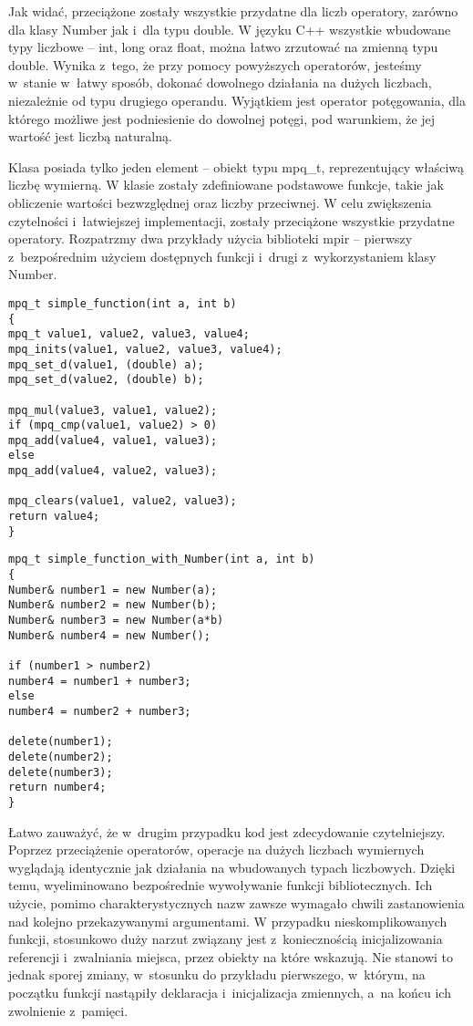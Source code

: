 Jak widać, przeciążone zostały wszystkie przydatne dla liczb operatory, zarówno dla klasy Number jak i~dla typu double. W języku C++ wszystkie wbudowane typy liczbowe -- int, long oraz float, można łatwo zrzutować na zmienną typu double. Wynika z~tego, że przy pomocy powyższych operatorów, jesteśmy w~stanie w~łatwy sposób, dokonać dowolnego działania na dużych liczbach, niezależnie od typu drugiego operandu. Wyjątkiem jest operator potęgowania, dla którego możliwe jest podniesienie do dowolnej potęgi, pod warunkiem, że jej wartość jest liczbą naturalną.

Klasa posiada tylko jeden element – obiekt typu mpq\_t, reprezentujący właściwą liczbę wymierną. W klasie zostały zdefiniowane podstawowe funkcje, takie jak obliczenie wartości bezwzględnej oraz liczby przeciwnej. W celu zwiększenia czytelności i~łatwiejszej implementacji, zostały przeciążone wszystkie przydatne operatory. Rozpatrzmy dwa przykłady użycia biblioteki mpir – pierwszy z~bezpośrednim użyciem dostępnych funkcji i~drugi z~wykorzystaniem klasy Number.

\begin{lstlisting}
mpq_t simple_function(int a, int b)
{
mpq_t value1, value2, value3, value4;
mpq_inits(value1, value2, value3, value4);
mpq_set_d(value1, (double) a);
mpq_set_d(value2, (double) b);

mpq_mul(value3, value1, value2);
if (mpq_cmp(value1, value2) > 0)
mpq_add(value4, value1, value3);
else
mpq_add(value4, value2, value3);

mpq_clears(value1, value2, value3);
return value4;
}
\end{lstlisting}

\begin{lstlisting}
mpq_t simple_function_with_Number(int a, int b)
{
Number& number1 = new Number(a);
Number& number2 = new Number(b);
Number& number3 = new Number(a*b)
Number& number4 = new Number();

if (number1 > number2)
number4 = number1 + number3;
else
number4 = number2 + number3;

delete(number1);
delete(number2);
delete(number3);
return number4;
}
\end{lstlisting}

Łatwo zauważyć, że w~drugim przypadku kod jest zdecydowanie czytelniejszy. Poprzez przeciążenie operatorów, operacje na dużych liczbach wymiernych wyglądają identycznie jak działania na wbudowanych typach liczbowych. Dzięki temu, wyeliminowano bezpośrednie wywoływanie funkcji bibliotecznych. Ich użycie, pomimo charakterystycznych nazw zawsze wymagało chwili zastanowienia nad kolejno przekazywanymi argumentami. W przypadku nieskomplikowanych funkcji, stosunkowo duży narzut związany jest z~koniecznością inicjalizowania referencji i~zwalniania miejsca, przez obiekty na które wskazują. Nie stanowi to jednak sporej zmiany, w~stosunku do przykładu pierwszego, w~którym, na początku funkcji nastąpiły deklaracja i~inicjalizacja zmiennych, a~na końcu ich zwolnienie z~pamięci.

